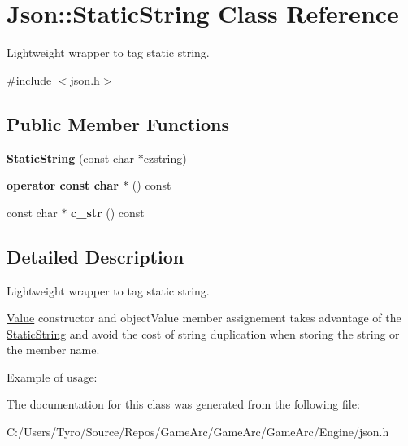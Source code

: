 \hypertarget{class_json_1_1_static_string}{}\section{Json\+::Static\+String Class Reference}
\label{class_json_1_1_static_string}


Lightweight wrapper to tag static string.  




{\ttfamily \#include $<$json.\+h$>$}

\subsection*{Public Member Functions}
\begin{DoxyCompactItemize}
\item 
\mbox{\label{class_json_1_1_static_string_afb6baf1ec078ce76f0b0f9b39d19437f}} 
{\bfseries Static\+String} (const char $\ast$czstring)
\item 
\mbox{\label{class_json_1_1_static_string_a256a6cc0c630aef670848a0f11707b62}} 
{\bfseries operator const char $\ast$} () const
\item 
\mbox{\label{class_json_1_1_static_string_ad6be703d432d108623bb0aa06b0b90ca}} 
const char $\ast$ {\bfseries c\+\_\+str} () const
\end{DoxyCompactItemize}


\subsection{Detailed Description}
Lightweight wrapper to tag static string. 

\mbox{\hyperlink{class_json_1_1_value}{Value}} constructor and object\+Value member assignement takes advantage of the \mbox{\hyperlink{class_json_1_1_static_string}{Static\+String}} and avoid the cost of string duplication when storing the string or the member name.

Example of usage\+: 
\begin{DoxyCode}{0}
\end{DoxyCode}
 

The documentation for this class was generated from the following file\+:\begin{DoxyCompactItemize}
\item 
C\+:/\+Users/\+Tyro/\+Source/\+Repos/\+Game\+Arc/\+Game\+Arc/\+Game\+Arc/\+Engine/json.\+h\end{DoxyCompactItemize}
